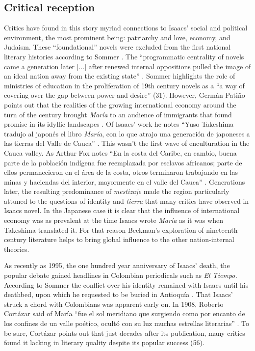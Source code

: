 \documentclass[12pt]{report}\usepackage[]{graphicx}\usepackage[]{color}
\begin{document}
\begin{spacing}{1.9}
\subsection{Critical reception}
Critics have found in this story myriad connections to Isaacs' social and political environment, the most prominent being: patriarchy and love, economy,  and Judaism.
These \enquote{foundational} novels were excluded from the first national literary histories according to Sommer \autocite{Sommer1991}. 
The \enquote{programmatic centrality of novels came a generation later [...] after renewed internal oppositions pulled the image of an ideal nation away from the existing state} \autocite[30]{Sommer1991}.
Sommer highlights the role of ministries of education in the proliferation of 19th century novels as a \enquote{a way of covering over the gap between power and desire} (31). 
However, Germán Patiño points out that the realities of the growing international economy around the turn of the century brought \textit{María} to an audience of immigrants that found promise in its idyllic landscapes \nocite{Patino1992}. 
Of Isaacs' work he notes \enquote{Yuso Takeshima tradujo al japonés el libro \textit{María}, con lo que atrajo una generación de japoneses a las tierras del Valle de Cauca} \autocite[37]{Patino1992}.
This wasn't the first wave of enculturation in the Cauca valley.
As Arthur Fox notes \enquote{En la costa del Caribe, en cambio, buena parte de la población indígena fue reemplazada por esclavos africanos; parte de ellos permanecieron en el área de la costa, otros terminaron trabajando en las minas y haciendas del interior, mayormente en el valle del Cauca} \autocite[333]{Fox2011}. 
Generations later, the resulting predominance of \textit{mestizaje} made the region particularly attuned to the questions of identity and \textit{tierra} that many critics have observed in Isaacs novel. 
In the Japanese case it is clear that the influence of international economy was as prevalent at the time Isaacs wrote \textit{María} as it was when Takeshima translated it. 
For that reason Beckman's exploration of nineteenth-century literature helps to bring global influence to the other nation-internal theories.


As recently as 1995, the one hundred year anniversary of Isaacs' death, the popular debate gained headlines in Colombian periodicals such as \textit{El Tiempo.}
According to Sommer  the conflict over his identity remained with Isaacs until his deathbed, upon which he requested to be buried in Antioquía \autocite[268]{Sommer1997}.
That Isaacs' struck a chord with Colombians was apparent early on. In 1908, Roberto Cortázar said of María \enquote{fue el sol meridiano que surgiendo como por encanto de los confines de un valle poético, ocultó con su luz muchas estrellas literarias} \autocite[55]{Cortazar1908}. 
To be sure, Cortázar points out that just decades after its publication, many critics found it lacking in literary quality despite its popular success (56)\nocite{Cortazar1908}.



\end{spacing}
\end{document}
